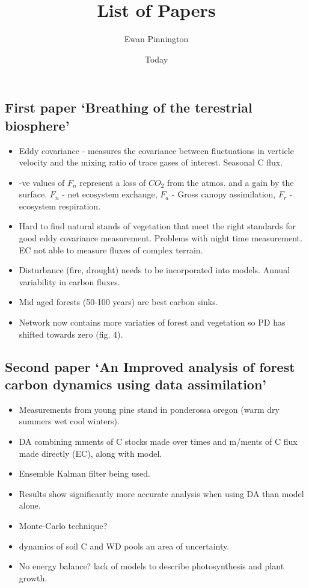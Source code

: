 \documentclass[11pt]{article}
\title{List of Papers}
\author{Ewan Pinnington}
\date{Today}
\begin{document}
\maketitle


\subsection*{First paper `Breathing of the terestrial biosphere' \cite{baldocchi2008turner}}
\noindent
\begin{itemize}
\item Eddy covariance - measures the covariance between fluctuations in verticle velocity and the mixing ratio of trace gases of interest. Seasonal C flux.
\item -ve values of $F_{n}$ represent a loss of $CO_{2}$ from the atmos. and a gain by the surface. $F_{n}$ - net ecosystem exchange, $F_{a}$ - Gross canopy assimilation, $F_{r}$ - ecosystem respiration.
\item Hard to find natural stands of vegetation that meet the right standards for good eddy covariance measurement. Problems with night time measurement. EC not able to measure fluxes of complex terrain.
\item Disturbance (fire, drought) needs to be incorporated into models. Annual variability in carbon fluxes. 
\item Mid aged forests (50-100 years) are best carbon sinks.
\item Network now contains more variaties of forest and vegetation so PD has shifted towards zero (fig. 4).
\end{itemize}

\subsection*{Second paper `An Improved analysis of forest carbon dynamics using data assimilation' \cite{williams2005improved}}

\begin{itemize}
\item Measurements from young pine stand in ponderossa oregon (warm dry summers wet cool winters).
\item DA combining mments of C stocks made over times and m/ments of C flux made directly (EC), along with model.
\item Ensemble Kalman filter being used.
\item Results show significantly more accurate analysis when using DA than model alone.
\item Monte-Carlo technique?
\item dynamics of soil C and WD pools an area of uncertainty.
\item No energy balance? lack of models to describe photosynthesis and plant growth.
\end{itemize}
\end{document}
